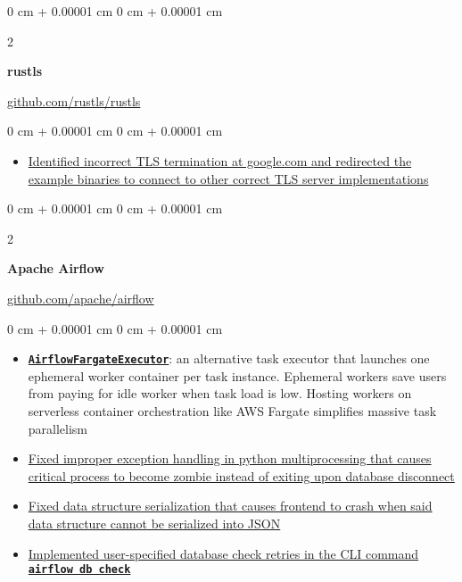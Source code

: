 \documentclass[10pt, letterpaper]{article}
\newenvironment{highlights}{
    \begin{itemize}[
        topsep=0.10 cm,
        parsep=0.10 cm,
        partopsep=0pt,
        itemsep=0pt,
        leftmargin=0 cm + 10pt
    ]
}{
    \end{itemize}
} %
\newenvironment{onecolentry}{
    \begin{adjustwidth}{
        0 cm + 0.00001 cm
    }{
        0 cm + 0.00001 cm
    }
}{
    \end{adjustwidth}
} %
\newenvironment{twocolentry}[2][]{
    \onecolentry
    \def\secondColumn{#2}
    \setcolumnwidth{\fill, 4.5 cm}
    \begin{paracol}{2}
}{
    \switchcolumn \raggedleft \secondColumn
    \end{paracol}
    \endonecolentry
} %
\begin{document}
        \begin{twocolentry}
            {\href{https://github.com/rustls/rustls}{github.com/rustls/rustls}}
            \textbf{rustls}
        \end{twocolentry}
        \vspace{0.1cm}
        \begin{onecolentry}
            \begin{highlights}
               \item \href{https://github.com/rustls/rustls/pull/1328}{Identified incorrect TLS termination at google.com and redirected the example binaries to connect to other correct TLS server implementations} 
            \end{highlights}
        \end{onecolentry}
        \vspace{0.2cm}

        \begin{twocolentry}
            {\href{https://github.com/apache/airflow}{github.com/apache/airflow}}
            {\textbf{Apache Airflow}}
        \end{twocolentry}
        \vspace{0.1cm}
        \begin{onecolentry}
            \begin{highlights}
                \item \href{https://github.com/aelzeiny/airflow-aws-executors/tree/master}{\textbf{\texttt{AirflowFargateExecutor}}}: an alternative task executor that launches one ephemeral worker container per task instance. Ephemeral workers save users from paying for idle worker when task load is low. Hosting workers on serverless container orchestration like AWS Fargate simplifies massive task parallelism
                \item \href{https://github.com/apache/airflow/issues/32706}{Fixed improper exception handling in python multiprocessing that causes critical process to become zombie instead of exiting upon database disconnect}
                \item \href{https://github.com/apache/airflow/pull/32385}{Fixed data structure serialization that causes frontend to crash when said data structure cannot be serialized into JSON}
                \item \href{https://github.com/apache/airflow/pull/31836}{Implemented user-specified database check retries in the CLI command \texttt{\textbf{airflow db check}}}
            \end{highlights}
        \end{onecolentry}
\end{document}
